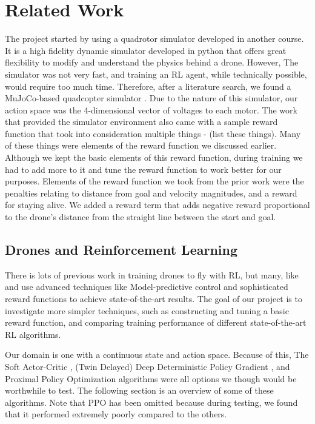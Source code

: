 \section{Related Work}

The project started by using a quadrotor simulator developed in another course. It is a high fidelity dynamic simulator developed in python that offers great flexibility to modify and understand the physics behind a drone. However, The simulator was not very fast, and training an RL agent, while technically possible, would require too much time. Therefore, after a literature search, we found a MuJoCo-based quadcopter simulator \cite{adipandas}. Due to the nature of this simulator, our action space was the 4-dimensional vector of voltages to each motor. The work that provided the simulator environment also came with a sample reward function that took into consideration multiple things - (list these things). Many of these things were elements of the reward function we discussed earlier. Although we kept the basic elements of this reward function, during training we had to add more to it and tune the reward function to work better for our purposes. Elements of the reward function we took from the prior work were the penalties relating to distance from goal and velocity magnitudes, and a reward for staying alive. We added a reward term that adds negative reward proportional to the drone's distance from the straight line between the start and goal.

\subsection{Drones and Reinforcement Learning}

There is lots of previous work in training drones to fly with RL, but many, like \cite{quadrl} and \cite{abbeel} use advanced techniques like Model-predictive control and sophisticated reward functions to achieve state-of-the-art results. The goal of our project is to investigate more simpler techniques, such as constructing and tuning a basic reward function, and comparing training performance of different state-of-the-art RL algorithms.


Our domain is one with a continuous state and action space. Because of this, The Soft Actor-Critic \cite{sac}, (Twin Delayed) Deep Deterministic Policy Gradient \cite{ddpg} \cite{td3}, and Proximal Policy Optimization algorithms \cite{ppo} were all options we though would be worthwhile to test. The following section is an overview of some of these algorithms. Note that PPO has been omitted because during testing, we found that it performed extremely poorly compared to the others.

